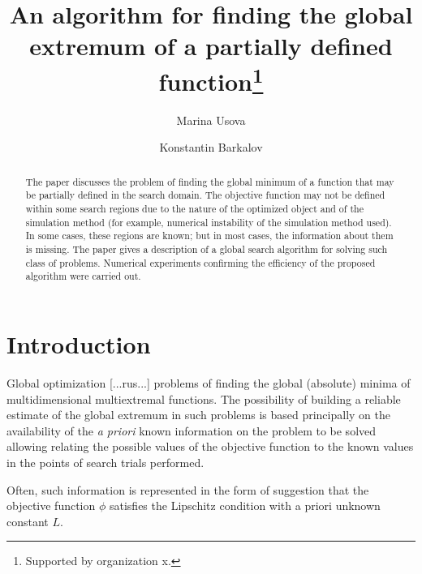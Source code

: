 \documentclass[runningheads]{llncs}
\begin{document}
%
\title{An algorithm for finding the global extremum 
of a partially defined function\thanks{Supported by organization x.}}
%
%
\author{Marina Usova \and
Konstantin Barkalov}
%
%
%
\maketitle              %
%
\begin{abstract}
The paper discusses the problem of finding the global minimum of a function that may be partially defined in the search domain. The objective function may not be defined within some search regions due to the nature of the optimized object and of the simulation method (for example, numerical instability of the simulation method used). In some cases, these regions are known; but in most cases, the information about them is missing. The paper gives a description of a global search algorithm for solving such class of problems. Numerical experiments confirming the efficiency of the proposed algorithm were carried out.

\end{abstract}
%
%
%
\section{Introduction}
Global optimization [...rus...] problems of finding the global (absolute) minima of multidimensional multiextremal functions. The possibility of building a reliable estimate of the global extremum in such problems is based principally on the availability of the \textit{a priori} known information on the problem to be solved allowing relating the possible values of the objective function to the known values in the points of search trials performed.

Often, such information is represented in the form of suggestion that the objective function $\phi$ satisfies the Lipschitz condition with a priori unknown constant $L$.
\end{document}
